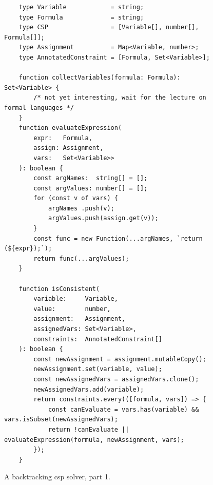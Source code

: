 \begin{figure}[!ht]
\centering
\begin{verbatim}
    type Variable            = string;
    type Formula             = string;
    type CSP                 = [Variable[], number[], Formula[]];          
    type Assignment          = Map<Variable, number>;
    type AnnotatedConstraint = [Formula, Set<Variable>];
    
    function collectVariables(formula: Formula): Set<Variable> {
        /* not yet interesting, wait for the lecture on formal languages */
    }
    function evaluateExpression(
        expr:   Formula, 
        assign: Assignment, 
        vars:   Set<Variable>>
    ): boolean {
        const argNames:  string[] = [];
        const argValues: number[] = [];
        for (const v of vars) {
            argNames .push(v);
            argValues.push(assign.get(v));
        }
        const func = new Function(...argNames, `return (${expr});`);
        return func(...argValues);
    }
      
    function isConsistent(
        variable:     Variable,
        value:        number,
        assignment:   Assignment,
        assignedVars: Set<Variable>,
        constraints:  AnnotatedConstraint[]
    ): boolean {
        const newAssignment = assignment.mutableCopy();
        newAssignment.set(variable, value);
        const newAssignedVars = assignedVars.clone();
        newAssignedVars.add(variable);
        return constraints.every(([formula, vars]) => {
            const canEvaluate = vars.has(variable) && vars.isSubset(newAssignedVars);
            return !canEvaluate || evaluateExpression(formula, newAssignment, vars);
        });
    }
\end{verbatim}
\vspace*{-0.3cm}
\caption{A backtracking \Gls{csp} solver, part 1.}
\label{fig:CSP-Solver.ipynb-1}
\end{figure} %

